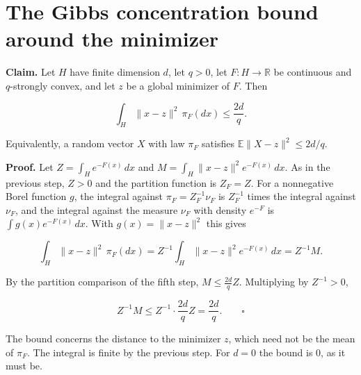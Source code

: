 \documentclass[11pt,a4paper]{article}
\begin{document}
\section{\texorpdfstring{The Gibbs concentration bound around the minimizer}{The Gibbs concentration bound around the minimizer}}


\textbf{Claim.} Let \(H\) have finite dimension \(d\), let \(q>0\), let \(F:H\to\mathbb R\) be continuous and \(q\)-strongly convex, and let \(z\) be a global minimizer of \(F\). Then


\[\int_H\|x-z\|^2\,\pi_F(dx)\le\frac{2d}{q}.\]


Equivalently, a random vector \(X\) with law \(\pi_F\) satisfies \(\mathbb E\|X-z\|^2\le2d/q\).




\textbf{Proof.} Let \(Z=\int_He^{-F(x)}\,dx\) and \(M=\int_H\|x-z\|^2e^{-F(x)}\,dx\). As in the previous step, \(Z>0\) and the partition function is \(Z_F=Z\). For a nonnegative Borel function \(g\), the integral against \(\pi_F=Z_F^{-1}\nu_F\) is \(Z_F^{-1}\) times the integral against \(\nu_F\), and the integral against the measure \(\nu_F\) with density \(e^{-F}\) is \(\int g(x)e^{-F(x)}\,dx\). With \(g(x)=\|x-z\|^2\) this gives


\[\int_H\|x-z\|^2\,\pi_F(dx)=Z^{-1}\int_H\|x-z\|^2e^{-F(x)}\,dx=Z^{-1}M.\]


By the partition comparison of the fifth step, \(M\le\frac{2d}qZ\). Multiplying by \(Z^{-1}>0\),


\[Z^{-1}M\le Z^{-1}\cdot\frac{2d}{q}Z=\frac{2d}{q}.\qquad\square\]


The bound concerns the distance to the minimizer \(z\), which need not be the mean of \(\pi_F\). The integral is finite by the previous step. For \(d=0\) the bound is \(0\), as it must be.
\end{document}
